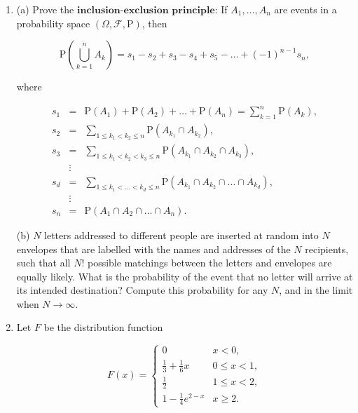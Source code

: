 \documentclass[11pt]{report}
\providecommand{\cal}{\mathcal}
\theoremstyle{plain}
\theoremstyle{definition}
\begin{document}
\begin{enumerate}[label=\arabic*.]
\[
\mathrm{P}(X \ge t\ |\ X \ge s) = \mathrm{P}(X \ge t-s)\qquad \textrm{ for all $0<s<t$}.
\]

Prove that exponential random variables have the
lack of memory property.

(d) Prove that any non-negative random variable that
has the lack of memory property has the exponential
distribution with some parameter $\lambda>0$. (This
is easier if one assumes that the function
$G(x)=\mathrm{P}(X\ge x)$ is differentiable on
$[0,\infty)$, so you can make this assumption if you
fail to find a more general argument).

\item (a) Prove the
$\textbf{inclusion-exclusion principle}$: If
$A_1,\ldots,A_n$ are events in a probability space
$(\Omega, {\cal F}, \mathrm{P})$, then

\[
\mathrm{P}\left(\bigcup_{k=1}^n A_k\right) = s_1 - s_2 + s_3 - s_4 + s_5 - \ldots + (-1)^{n-1} s_n,
\]

where

\begin{eqnarray*}
s_1 &=& \mathrm{P}(A_1) + \mathrm{P}(A_2) + \ldots + \mathrm{P}(A_n) = \sum_{k=1}^n \mathrm{P}(A_k), \\
s_2 &=& \sum_{1\le k_1 < k_2 \le n} \mathrm{P}(A_{k_1} \cap A_{k_2}), \\
s_3 &=& \sum_{1\le k_1 < k_2 < k_3 \le n} \mathrm{P}(A_{k_1} \cap A_{k_2} \cap A_{k_3}), \\
& \vdots &  \\
s_d &=& \sum_{1\le k_1 < \ldots< k_d \le n} \mathrm{P}(A_{k_1} \cap A_{k_2} \cap \ldots \cap A_{k_d}), \\
& \vdots &\\
s_n &=& \mathrm{P}(A_1 \cap A_2 \cap \ldots \cap A_n).
\end{eqnarray*}

(b) $N$ letters addressed to different people are
inserted at random into $N$ envelopes that are
labelled with the names and addresses of the $N$
recipients, such that all $N!$ possible matchings
between the letters and envelopes are equally likely.
What is the probability of the event that no letter
will arrive at its intended destination? Compute this
probability for any $N$, and in the limit when
$N\to\infty$.

\item Let $F$ be the distribution function

\[
F(x) = \begin{cases}
0 & x < 0, \\
\frac13 + \frac16 x & 0\le x < 1, \\
\frac12 & 1\le x < 2, \\
1-\frac14e^{2-x} & x\ge 2.
\end{cases}
\]


\end{enumerate}
\end{document}
